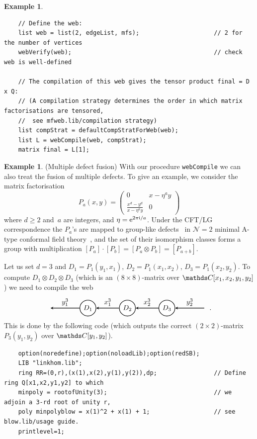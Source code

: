 \documentclass{compositio}
\theoremstyle{definition}
\newtheorem{example}[theorem]{Example}
\numberwithin{equation}{section}
\begin{document}
\begin{example}
{\begin{verbatim}
    // Define the web:
    list web = list(2, edgeList, mfs);                     // 2 for the number of vertices
    webVerify(web);                                        // check web is well-defined
    
    // The compilation of this web gives the tensor product final = D x Q:
    // (A compilation strategy determines the order in which matrix factorisations are tensored, 
    //  see mfweb.lib/compilation strategy)
    list compStrat = defaultCompStratForWeb(web);
    list L = webCompile(web, compStrat);
    matrix final = L[1];
\end{verbatim}
}
\end{example}


\begin{example}(Multiple defect fusion)
With our procedure \texttt{webCompile} we can also treat the fusion of multiple defects. To give an example, we consider the matrix factorisation
$$
P_{a}(x,y)=\begin{pmatrix} 0 & x-\eta^{a} y \\ \frac{x^d-y^d}{x-\eta^{a} y} & 0\end{pmatrix}
$$
where $d\geqslant 2$ and~$a$ are integers, and $\eta=\operatorname{e}\!^{2\pi\!\operatorname{i}\!/a}$. Under the CFT/LG correspondence the $P_{a}$'s are mapped to group-like defects~\cite{ffrs0607247} in $\mathcal N=2$ minimal A-type conformal field theory~\cite{br0707.0922, cr0909.4381}, and the set of their isomorphism classes forms a group with multiplication $[P_{a}]\cdot[P_{b}] = [P_{a}\otimes P_{b}] = [P_{a+b}]$. 

Let us set $d=3$ and $D_{1}=P_{1}(y_{1},x_{1})$, $D_{2}=P_{1}(x_{1},x_{2})$, $D_{3}=P_{1}(x_{2},y_{2})$. To compute $D_{1}\otimes D_{2}\otimes D_{3}$ (which is an $(8\times 8)$-matrix over $\nC[x_{1},x_{2},y_{1},y_{2}]$) we need to compile the web
$$
\begin{tikzpicture}[scale=1.0,baseline=-0.1cm, inner sep=1mm, >=stealth]
\node (b) at (-2,0)  {};
\node (D1) at (0,0) [circle,draw=black,fill= white, thick] {$D_{1}$};
\node (D2) at (2,0) [circle,draw=black,fill= white, thick] {$D_{2}$};
\node (D3) at (4,0) [circle,draw=black,fill= white, thick] {$D_{3}$};
\node (b2) at (6,0)  {};
\draw[->,  thick] (D1) -- (b) node[midway,above] {$y_{1}^3$}; 
\draw[->,  thick] (D2) -- (D1) node[midway,above] {$x_{1}^3$}; 
\draw[->,  thick] (D3) -- (D2) node[midway,above] {$x_{2}^3$}; 
\draw[->,  thick] (b2) -- (D3) node[midway,above] {$y_{2}^3$}; 
\end{tikzpicture} \, .
$$
This is done by the following code (which outputs the correct $(2\times 2)$-matrix $P_{3}(y_{1},y_{2})$ over $\nC[y_{1},y_{2}]$). 
{\footnotesize
\begin{verbatim}
    option(noredefine);option(noloadLib);option(redSB);
    LIB "linkhom.lib";
    ring RR=(0,r),(x(1),x(2),y(1),y(2)),dp;                // Define ring Q[x1,x2,y1,y2] to which
    minpoly = rootofUnity(3);                              // we adjoin a 3-rd root of unity r, 
    poly minpolyblow = x(1)^2 + x(1) + 1;                  // see blow.lib/usage guide.
    printlevel=1;
    

\end{verbatim}}
\end{example}
\end{document}

